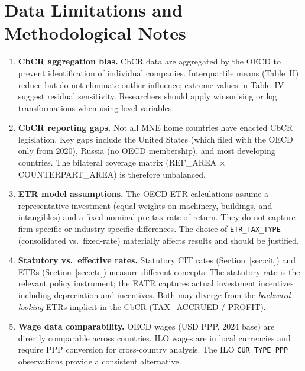 \documentclass[11pt,a4paper]{article}
\begin{document}
\section{Data Limitations and Methodological Notes}
\label{sec:limitations}

\begin{enumerate}

    \item \textbf{CbCR aggregation bias.}  CbCR data are aggregated by the OECD
    to prevent identification of individual companies.  Interquartile means
    (Table~II) reduce but do not eliminate outlier influence; extreme values in
    Table~IV suggest residual sensitivity.  Researchers should apply winsorising
    or log transformations when using level variables.

    \item \textbf{CbCR reporting gaps.}  Not all MNE home countries have enacted
    CbCR legislation.  Key gaps include the United States (which filed with the
    OECD only from 2020), Russia (no OECD membership), and most developing
    countries.  The bilateral coverage matrix (REF\_AREA $\times$
    COUNTERPART\_AREA) is therefore unbalanced.

    \item \textbf{ETR model assumptions.}  The OECD ETR calculations assume a
    representative investment (equal weights on machinery, buildings, and
    intangibles) and a fixed nominal pre-tax rate of return.  They do not capture
    firm-specific or industry-specific differences.  The choice of
    \texttt{ETR\_TAX\_TYPE} (consolidated vs.\ fixed-rate) materially affects
    results and should be justified.

    \item \textbf{Statutory vs.\ effective rates.}  Statutory CIT rates
    (Section~\ref{sec:cit}) and ETRs (Section~\ref{sec:etr}) measure different
    concepts.  The statutory rate is the relevant policy instrument; the EATR
    captures actual investment incentives including depreciation and incentives.
    Both may diverge from the \emph{backward-looking} ETRs implicit in the CbCR
    (TAX\_ACCRUED / PROFIT).

    \item \textbf{Wage data comparability.}  OECD wages (USD PPP, 2024 base)
    are directly comparable across countries.  ILO wages are in local currencies
    and require PPP conversion for cross-country analysis.  The ILO
    \texttt{CUR\_TYPE\_PPP} observations provide a consistent alternative.


\end{enumerate}
\end{document}

